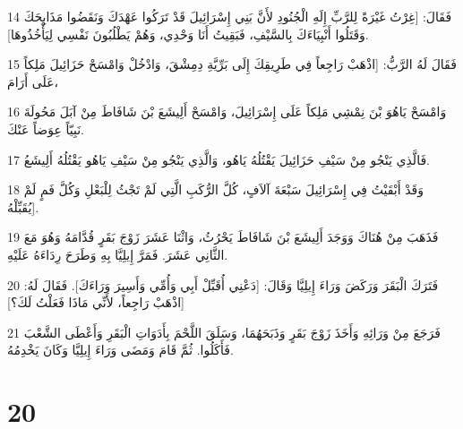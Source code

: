 \par 14 فَقَالَ: [غِرْتُ غَيْرَةً لِلرَّبِّ إِلَهِ الْجُنُودِ لأَنَّ بَنِي إِسْرَائِيلَ قَدْ تَرَكُوا عَهْدَكَ وَنَقَضُوا مَذَابِحَكَ وَقَتَلُوا أَنْبِيَاءَكَ بِالسَّيْفِ، فَبَقِيتُ أَنَا وَحْدِي، وَهُمْ يَطْلُبُونَ نَفْسِي لِيَأْخُذُوهَا].
\par 15 فَقَالَ لَهُ الرَّبُّ: [اذْهَبْ رَاجِعاً فِي طَرِيقِكَ إِلَى بَرِّيَّةِ دِمِشْقَ، وَادْخُلْ وَامْسَحْ حَزَائِيلَ مَلِكاً عَلَى أَرَامَ،
\par 16 وَامْسَحْ يَاهُوَ بْنَ نِمْشِي مَلِكاً عَلَى إِسْرَائِيلَ، وَامْسَحْ أَلِيشَعَ بْنَ شَافَاطَ مِنْ آبَلَ مَحُولَةَ نَبِيّاً عِوَضاً عَنْكَ.
\par 17 فَالَّذِي يَنْجُو مِنْ سَيْفِ حَزَائِيلَ يَقْتُلُهُ يَاهُو، وَالَّذِي يَنْجُو مِنْ سَيْفِ يَاهُو يَقْتُلُهُ أَلِيشَعُ.
\par 18 وَقَدْ أَبْقَيْتُ فِي إِسْرَائِيلَ سَبْعَةَ آلاَفٍ، كُلَّ الرُّكَبِ الَّتِي لَمْ تَجْثُ لِلْبَعْلِ وَكُلَّ فَمٍ لَمْ يُقَبِّلْهُ].
\par 19 فَذَهَبَ مِنْ هُنَاكَ وَوَجَدَ أَلِيشَعَ بْنَ شَافَاطَ يَحْرُثُ، وَاثْنَا عَشَرَ زَوْجَ بَقَرٍ قُدَّامَهُ وَهُوَ مَعَ الثَّانِي عَشَرَ. فَمَرَّ إِيلِيَّا بِهِ وَطَرَحَ رِدَاءَهُ عَلَيْهِ.
\par 20 فَتَرَكَ الْبَقَرَ وَرَكَضَ وَرَاءَ إِيلِيَّا وَقَالَ: [دَعْنِي أُقَبِّلْ أَبِي وَأُمِّي وَأَسِيرَ وَرَاءَكَ]. فَقَالَ لَهُ: [اذْهَبْ رَاجِعاً، لأَنِّي مَاذَا فَعَلْتُ لَكَ؟]
\par 21 فَرَجَعَ مِنْ وَرَائِهِ وَأَخَذَ زَوْجَ بَقَرٍ وَذَبَحَهُمَا، وَسَلَقَ اللَّحْمَ بِأَدَوَاتِ الْبَقَرِ وَأَعْطَى الشَّعْبَ فَأَكَلُوا. ثُمَّ قَامَ وَمَضَى وَرَاءَ إِيلِيَّا وَكَانَ يَخْدِمُهُ.

\chapter{20}


